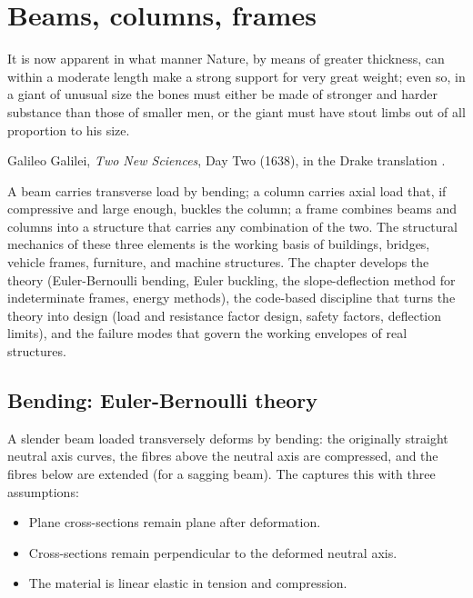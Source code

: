 \chapter{Beams, columns, frames}
\label{vol03:ch08}

\epigraph{It is now apparent in what manner Nature, by means of
greater thickness, can within a moderate length make a strong
support for very great weight; even so, in a giant of unusual size
the bones must either be made of stronger and harder substance than
those of smaller men, or the giant must have stout limbs out of all
proportion to his size.}{Galileo Galilei, \emph{Two New Sciences},
Day Two (1638), in the Drake translation \cite[pp.~127--128]{
hist:galileo1638}.}


\noindent
A beam carries transverse load by bending; a column carries axial
load that, if compressive and large enough, buckles the column; a
frame combines beams and columns into a structure that carries any
combination of the two. The structural mechanics of these three
elements is the working basis of buildings, bridges, vehicle frames,
furniture, and machine structures. The chapter develops the
theory (Euler-Bernoulli bending, Euler buckling, the slope-deflection
method for indeterminate frames, energy methods), the code-based
discipline that turns the theory into design (load and resistance
factor design, safety factors, deflection limits), and the failure
modes that govern the working envelopes of real structures.

\section{Bending: Euler-Bernoulli theory}

A slender beam loaded transversely deforms by bending: the originally
straight neutral axis curves, the fibres above the neutral axis are
compressed, and the fibres below are extended (for a sagging beam).
The  captures this with three
assumptions:

\begin{itemize}[leftmargin=*]
  \item Plane cross-sections remain plane after deformation.
  \item Cross-sections remain perpendicular to the deformed neutral
    axis.
  \item The material is linear elastic in tension and compression.
\end{itemize}

